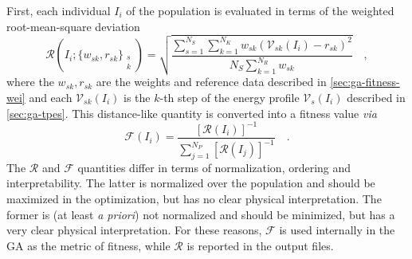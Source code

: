 \documentclass[10pt,a4paper,openany]{memoir}
\numberwithin{equation}{section}
\begin{document}
First, each individual $I_i$ of the population is evaluated in terms of the weighted root-mean-square deviation
\begin{equation}
  \label{eq:ga-fitness-rmsd}
  \mathcal{R}\left(I_i;\{w_{sk},r_{sk}\}_{\substack{s\\k}} \right) = \sqrt{\frac{\sum_{s=1}^{N_S} \sum_{k=1}^{N_K} w_{sk}(\mathcal{V}_{sk}(I_i)-r_{sk})^2}{N_S \sum_{k=1}^{N_R} w_{sk}}} \quad ,
\end{equation}
where the $w_{sk},r_{sk}$ are the weights and reference data described in \autoref{sec:ga-fitness-wei}
and each $\mathcal{V}_{sk}(I_i)$ is the $k$-th step of the energy profile $\mathcal{V}_s(I_i)$ described in \autoref{sec:ga-tpes}.
This distance-like quantity is converted into a fitness value \textit{via}
\begin{equation}
  \label{eq:ga-fitness}
  \mathcal{F}(I_i) =\frac{\left[\mathcal{R}(I_i)\right]^{-1}}{\sum_{j=1}^{N_P} \left[\mathcal{R}(I_j)\right]^{-1}} \quad .
\end{equation}
The $\mathcal{R}$ and $\mathcal{F}$ quantities differ in terms of normalization, ordering and interpretability.
The latter is normalized over the population and should be maximized in the optimization, but has no clear physical interpretation.
The former is (at least \textit{a priori}) not normalized and should be minimized, but has a very clear physical interpretation.
For these reasons, $\mathcal{F}$ is used internally in the GA as the metric of fitness, while $\mathcal{R}$ is reported in the output files.

\end{document}
